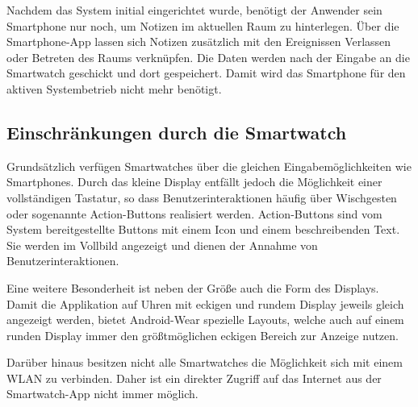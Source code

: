 Nachdem das System initial eingerichtet wurde, benötigt der Anwender sein Smartphone nur noch, um Notizen im aktuellen Raum zu hinterlegen. Über die Smartphone-App lassen sich Notizen zusätzlich mit den Ereignissen Verlassen oder Betreten des Raums verknüpfen. Die Daten werden nach der Eingabe an die Smartwatch geschickt und dort gespeichert. Damit wird das Smartphone für den aktiven Systembetrieb nicht mehr benötigt.

\subsection{Einschränkungen durch die Smartwatch}
\label{sec:einschraenkungen}
Grundsätzlich verfügen Smartwatches über die gleichen Eingabemöglichkeiten wie Smartphones. Durch das kleine Display entfällt jedoch die Möglichkeit einer vollständigen Tastatur, so dass Benutzerinteraktionen häufig über Wischgesten oder sogenannte Action-Buttons realisiert werden. Action-Buttons sind vom System bereitgestellte Buttons mit einem Icon und einem beschreibenden Text. Sie werden im Vollbild angezeigt und dienen der Annahme von Benutzerinteraktionen.

Eine weitere Besonderheit ist neben der Größe auch die Form des Displays. Damit die Applikation auf Uhren mit eckigen und rundem Display jeweils gleich angezeigt werden, bietet Android-Wear spezielle Layouts, welche auch auf einem runden Display immer den größtmöglichen eckigen Bereich zur Anzeige nutzen.

Darüber hinaus besitzen nicht alle Smartwatches die Möglichkeit sich mit einem WLAN zu verbinden. Daher ist ein direkter Zugriff auf das Internet aus der Smartwatch-App nicht immer möglich.
